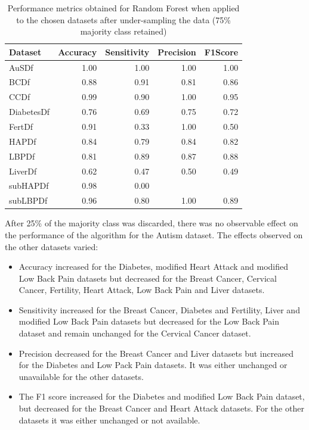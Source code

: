 \begin{table}[ht]
\centering
\begin{tabular}{lrrrr}
  \hline
  \rowcolor{LightCyan}
Dataset & Accuracy & Sensitivity & Precision & F1Score \\ 
  \hline
AuSDf & 1.00 & 1.00 & 1.00 & 1.00 \\ 
  BCDf & 0.88 & 0.91 & 0.81 & 0.86 \\ 
  CCDf & 0.99 & 0.90 & 1.00 & 0.95 \\ 
  DiabetesDf & 0.76 & 0.69 & 0.75 & 0.72 \\ 
  FertDf & 0.91 & 0.33 & 1.00 & 0.50 \\ 
  HAPDf & 0.84 & 0.79 & 0.84 & 0.82 \\ 
  LBPDf & 0.81 & 0.89 & 0.87 & 0.88 \\ 
  LiverDf & 0.62 & 0.47 & 0.50 & 0.49 \\ 
  subHAPDf & 0.98 & 0.00 &  &  \\ 
  subLBPDf & 0.96 & 0.80 & 1.00 & 0.89 \\ 
   \hline
\end{tabular}
\caption{Performance metrics obtained for Random Forest when applied to the chosen datasets after under-sampling the data (75\% majority class retained)}
\label{tab:RfMetrics75}
\end{table}

After 25\% of the majority class was discarded, there was no observable effect on the performance of the algorithm for the Autism dataset. The effects observed on the other datasets varied:
\begin{itemize}
    \item Accuracy increased for the Diabetes, modified Heart Attack and modified Low Back Pain datasets but decreased for the Breast Cancer, Cervical Cancer, Fertility, Heart Attack, Low Back Pain and Liver datasets.
    \item Sensitivity increased for the Breast Cancer, Diabetes and Fertility, Liver and modified Low Back Pain datasets but decreased for the Low Back Pain dataset and remain unchanged for the Cervical Cancer dataset.
    \item Precision decreased for the Breast Cancer and Liver datasets but increased for the Diabetes and Low Pack Pain datasets. It was either unchanged or unavailable for the other datasets.
    \item The F1 score increased for the Diabetes and modified Low Back Pain dataset, but decreased for the Breast Cancer and Heart Attack datasets. For the other datasets it was either unchanged or not available.
\end{itemize}

